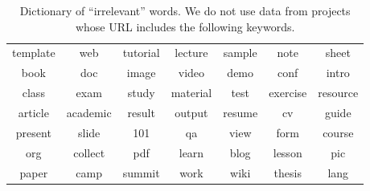 \documentclass[sigconf,review,anonymous]{acmart}
\begin{document}
 
\begin{table}[!b]
\caption{Dictionary of ``irrelevant'' words. We do not use data from projects whose URL includes the following keywords.}
\label{tbl:dict}
\begin{adjustbox}{max width=0.48\textwidth}
\begin{tabular}{ccccccc}
\rowcolor[HTML]{BDBDBD} 
\multicolumn{7}{c}{\cellcolor[HTML]{BDBDBD}{\color[HTML]{000000} Suspicious Keywords}} \\ \hline
\rowcolor[HTML]{FFFFFF} 
{\color[HTML]{000000} template} & {\color[HTML]{000000} web} & {\color[HTML]{000000} tutorial} & {\color[HTML]{000000} lecture} & {\color[HTML]{000000} sample} & {\color[HTML]{000000} note} & {\color[HTML]{000000} sheet} \\
\rowcolor[HTML]{F3F3F3} 
{\color[HTML]{000000} book} & {\color[HTML]{000000} doc} & {\color[HTML]{000000} image} & {\color[HTML]{000000} video} & {\color[HTML]{000000} demo} & {\color[HTML]{000000} conf} & {\color[HTML]{000000} intro} \\
\rowcolor[HTML]{FFFFFF} 
{\color[HTML]{000000} class} & {\color[HTML]{000000} exam} & {\color[HTML]{000000} study} & {\color[HTML]{000000} material} & {\color[HTML]{000000} test} & {\color[HTML]{000000} exercise} & {\color[HTML]{000000} resource} \\
\rowcolor[HTML]{F3F3F3} 
{\color[HTML]{000000} article} & {\color[HTML]{000000} academic} & {\color[HTML]{000000} result} & {\color[HTML]{000000} output} & {\color[HTML]{000000} resume} & {\color[HTML]{000000} cv} & {\color[HTML]{000000} guide} \\
\rowcolor[HTML]{FFFFFF} 
{\color[HTML]{000000} present} & {\color[HTML]{000000} slide} & {\color[HTML]{000000} 101} & {\color[HTML]{000000} qa} & {\color[HTML]{000000} view} & {\color[HTML]{000000} form} & {\color[HTML]{000000} course} \\
\rowcolor[HTML]{F3F3F3} 
{\color[HTML]{000000} org} & {\color[HTML]{000000} collect} & {\color[HTML]{000000} pdf} & {\color[HTML]{000000} learn} & {\color[HTML]{000000} blog} & {\color[HTML]{000000} lesson} & {\color[HTML]{000000} pic} \\
\rowcolor[HTML]{FFFFFF} 
{\color[HTML]{000000} paper} & {\color[HTML]{000000} camp} & {\color[HTML]{000000} summit} & {\color[HTML]{000000} work} & {\color[HTML]{000000} wiki} & {\color[HTML]{000000} thesis} & {\color[HTML]{000000} lang}
\end{tabular}
\end{adjustbox}
\end{table}
  
\end{document}
